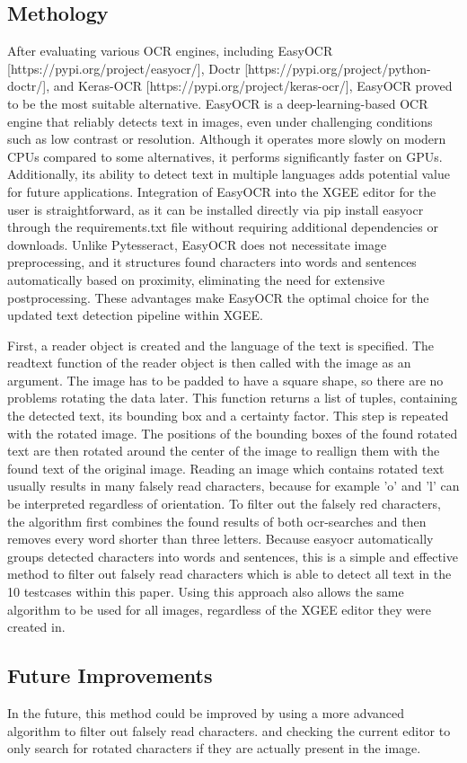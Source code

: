 \subsection{Methology}
After evaluating various OCR engines, including EasyOCR [https://pypi.org/project/easyocr/], Doctr [https://pypi.org/project/python-doctr/], and Keras-OCR [https://pypi.org/project/keras-ocr/], EasyOCR proved to be the most suitable alternative.
EasyOCR is a deep-learning-based OCR engine that reliably detects text in images, even under challenging conditions such as low contrast or resolution. Although it operates more slowly on modern CPUs compared to some alternatives, it performs significantly faster on GPUs. Additionally, its ability to detect text in multiple languages adds potential value for future applications. Integration of EasyOCR into the XGEE editor for the user is straightforward, as it can be installed directly via pip install easyocr through the requirements.txt file without requiring additional dependencies or downloads. Unlike Pytesseract, EasyOCR does not necessitate image preprocessing, and it structures found characters into words and sentences automatically based on proximity, eliminating the need for extensive postprocessing. These advantages make EasyOCR the optimal choice for the updated text detection pipeline within XGEE.

First, a reader object is created and the language of the text is specified. The readtext function of the reader object is then called with the image as an argument. The image has to be padded to have a square shape, so there are no problems rotating the data later. This function returns a list of tuples, containing the detected text, its bounding box and a certainty factor. This step is repeated with the rotated image. The positions of the bounding boxes of the found rotated text are then rotated around the center of the image to reallign them with the found text of the original image. Reading an image which contains rotated text usually results in many falsely read characters, because for example 'o' and 'l' can be interpreted regardless of orientation. To filter out the falsely red characters, the algorithm first combines the found results of both ocr-searches and then removes every word shorter than three letters. Because easyocr automatically groups detected characters into words and sentences, this is a simple and effective method to filter out falsely read characters which is able to detect all text in the 10 testcases within this paper. Using this approach also allows the same algorithm to be used for all images, regardless of the XGEE editor they were created in.
\subsection{Future Improvements}
In the future, this method could be improved by using a more advanced algorithm to filter out falsely read characters. and checking the current editor to only search for rotated characters if they are actually present in the image.